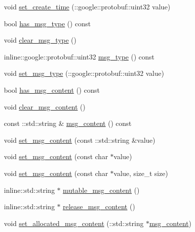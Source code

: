 \begin{DoxyCompactItemize}
\item 
void \hyperlink{class_i_m_1_1_base_define_1_1_client_msg_info_a1b08eef7ee772f0a2c43cd05d7627670}{set\+\_\+create\+\_\+time} (\+::google\+::protobuf\+::uint32 value)
\item 
bool \hyperlink{class_i_m_1_1_base_define_1_1_client_msg_info_ac3b928748a701cebac408c96c24e8363}{has\+\_\+msg\+\_\+type} () const 
\item 
void \hyperlink{class_i_m_1_1_base_define_1_1_client_msg_info_a612b5d2525c7d31977ce440ef4bebd45}{clear\+\_\+msg\+\_\+type} ()
\item 
inline\+::google\+::protobuf\+::uint32 \hyperlink{class_i_m_1_1_base_define_1_1_client_msg_info_aa31af00eb775e82b9abd95388e2012e3}{msg\+\_\+type} () const 
\item 
void \hyperlink{class_i_m_1_1_base_define_1_1_client_msg_info_a76476b53549e7d8bc11a77f4c094a7c6}{set\+\_\+msg\+\_\+type} (\+::google\+::protobuf\+::uint32 value)
\item 
bool \hyperlink{class_i_m_1_1_base_define_1_1_client_msg_info_ade8e9aa6912064e5b26eb47aca9a25ac}{has\+\_\+msg\+\_\+content} () const 
\item 
void \hyperlink{class_i_m_1_1_base_define_1_1_client_msg_info_a1fa34815febcc88bd727d8f70c620c0c}{clear\+\_\+msg\+\_\+content} ()
\item 
const \+::std\+::string \& \hyperlink{class_i_m_1_1_base_define_1_1_client_msg_info_ac790b72dc26a2301f69b62bd8877dae9}{msg\+\_\+content} () const 
\item 
void \hyperlink{class_i_m_1_1_base_define_1_1_client_msg_info_adf39c3c27125f9887357570f41561675}{set\+\_\+msg\+\_\+content} (const \+::std\+::string \&value)
\item 
void \hyperlink{class_i_m_1_1_base_define_1_1_client_msg_info_af47f38d04b23698163cb1c76637c4653}{set\+\_\+msg\+\_\+content} (const char $\ast$value)
\item 
void \hyperlink{class_i_m_1_1_base_define_1_1_client_msg_info_a213219c887b2dcaafe46a6cb67004419}{set\+\_\+msg\+\_\+content} (const char $\ast$value, size\+\_\+t size)
\item 
inline\+::std\+::string $\ast$ \hyperlink{class_i_m_1_1_base_define_1_1_client_msg_info_a94c04d4948efafb8352059f960c5751a}{mutable\+\_\+msg\+\_\+content} ()
\item 
inline\+::std\+::string $\ast$ \hyperlink{class_i_m_1_1_base_define_1_1_client_msg_info_af6001943fb9e31f137f30080d6c467f4}{release\+\_\+msg\+\_\+content} ()
\item 
void \hyperlink{class_i_m_1_1_base_define_1_1_client_msg_info_a54bb17764b44b0f6580891de7fe2cda7}{set\+\_\+allocated\+\_\+msg\+\_\+content} (\+::std\+::string $\ast$\hyperlink{class_i_m_1_1_base_define_1_1_client_msg_info_ac790b72dc26a2301f69b62bd8877dae9}{msg\+\_\+content})
\end{DoxyCompactItemize}
